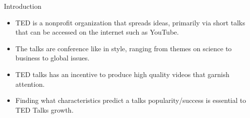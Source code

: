 \begin{frame}{Introduction}
    \begin{itemize}
		\item TED is a nonprofit organization that spreads ideas, primarily via short talks that can be accessed on the internet such as YouTube.
		\item The talks are conference like in style, ranging from themes on science to business to global issues.
		\item TED talks has an incentive to produce high quality videos that garnish attention. 
		\item Finding what characteristics predict a talks popularity/success is essential to TED Talks growth.
    \end{itemize}
\end{frame}